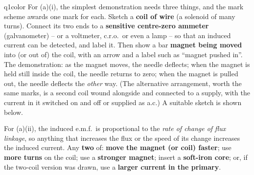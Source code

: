 \documentclass[11pt,a4paper]{article}
\begin{document}
\begin{ansbox}{q1color}
For (a)(i), the simplest demonstration needs three things, and the mark scheme awards one mark for each. Sketch a \textbf{coil of wire} (a solenoid of many turns). Connect its two ends to a \textbf{sensitive centre-zero ammeter} (galvanometer) -- or a voltmeter, c.r.o.\ or even a lamp -- so that an induced current can be detected, and label it. Then show a bar \textbf{magnet being moved} into (or out of) the coil, with an arrow and a label such as ``magnet pushed in''. The demonstration: as the magnet moves, the needle deflects; when the magnet is held still inside the coil, the needle returns to zero; when the magnet is pulled out, the needle deflects the \emph{other} way. (The alternative arrangement, worth the same marks, is a second coil wound alongside and connected to a supply, with the current in it switched on and off or supplied as a.c.) A suitable sketch is shown below.
\begin{center}
\end{center}

For (a)(ii), the induced e.m.f.\ is proportional to the \emph{rate of change of flux linkage}, so anything that increases the flux or the speed of its change increases the induced current. Any \textbf{two} of: \textbf{move the magnet (or coil) faster}; use \textbf{more turns} on the coil; use a \textbf{stronger magnet}; insert a \textbf{soft-iron core}; or, if the two-coil version was drawn, use a \textbf{larger current in the primary}.


\end{ansbox}
\end{document}
